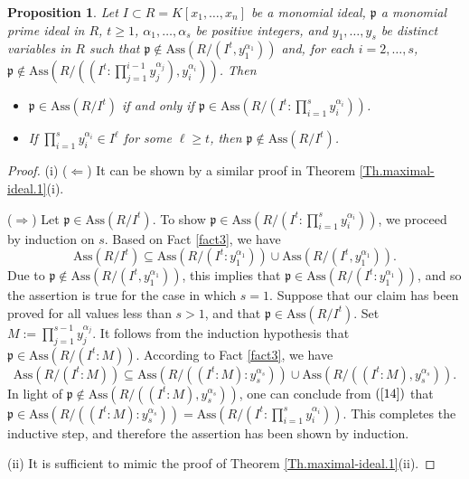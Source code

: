 \documentclass[11pt]{amsart}
\newtheorem{proposition}[theorem]{Proposition}
\begin{document}
\begin{proposition}    \label{Pro.maximal-ideal.1}
Let $I\subset R=K[x_1, \ldots, x_n]$ be a monomial ideal,  $\mathfrak{p}$ a monomial prime  ideal in $R$,  $t\geq 1$,  $\alpha_1, \ldots, \alpha_s$ be positive integers, and  $y_1, \ldots, y_s$ be distinct variables in $R$  such that  $\mathfrak{p}\notin \mathrm{Ass}(R/(I^t,  y_{1}^{\alpha_1}))$ and, for each  $i=2, \ldots, s$,
  $\mathfrak{p}\notin \mathrm{Ass}(R/((I^t:\prod_{j=1}^{i-1} y_j^{\alpha_j}), y_{i}^{\alpha_{i}}))$.  Then 
\begin{itemize}
\item[(i)] $\mathfrak{p}\in \mathrm{Ass}(R/I^t)$ if and only if $\mathfrak{p}\in \mathrm{Ass}(R/(I^t: \prod_{i=1}^sy_i^{\alpha_i}))$. 
\item[(ii)] If $\prod_{i=1}^{s}y_i^{\alpha_i} \in I^\ell$ for some $\ell \geq t$, then  $\mathfrak{p}\notin \mathrm{Ass}(R/I^t)$.
\end{itemize}
\end{proposition} 

\begin{proof}
(i) ($\Leftarrow$) It can be shown by a similar proof in Theorem  \ref{Th.maximal-ideal.1}(i). 

($\Rightarrow$) Let $\mathfrak{p}\in \mathrm{Ass}(R/I^t)$. To show   $\mathfrak{p}\in \mathrm{Ass}(R/(I^t: \prod_{i=1}^sy_i^{\alpha_i}))$,  we proceed by induction on  $s$. Based on   Fact \ref{fact3}, we have 
$$\mathrm{Ass}(R/I^t) \subseteq \mathrm{Ass}(R/(I^t:y_1^{\alpha_1})) \cup \mathrm{Ass}(R/(I^t, y_1^{\alpha_1})).$$
Due to  $\mathfrak{p}\notin \mathrm{Ass}(R/(I^t, y_1^{\alpha_1}))$, this implies  that  $\mathfrak{p}\in \mathrm{Ass}(R/(I^t:y_1^{\alpha_1}))$, and so the assertion  is true for the case in which $s=1$. Suppose that our claim has been proved for all values  less than $s>1$, and that $\mathfrak{p}\in \mathrm{Ass}(R/I^t)$. Set   $M:=\prod_{j=1}^{s-1}y_j^{\alpha_j}$. It follows from the induction hypothesis that   $\mathfrak{p}\in \mathrm{Ass}(R/(I^t:M))$. 
According to  Fact \ref{fact3}, we have 
\begin{equation} \label{14}
\mathrm{Ass}(R/(I^t:M))\subseteq \mathrm{Ass}(R/((I^t:M):y_s^{\alpha_s}) )\cup \mathrm{Ass}(R/((I^t:M),y_s^{\alpha_s})).
\end{equation} 
In  light of  $\mathfrak{p}\notin\mathrm{Ass}(R/((I^t:M), y_s^{\alpha_s}))$, one can conclude from 
 $(\ref{14})$ that  $\mathfrak{p}\in \mathrm{Ass}(R/((I^t:M): y_s^{\alpha_s}))=\mathrm{Ass}(R/(I^t:\prod_{i=1}^sy_i^{\alpha_i}))$. 
This completes the inductive step, and therefore the assertion  has been shown  by induction. 

(ii) It is sufficient    to mimic the proof of Theorem  \ref{Th.maximal-ideal.1}(ii).
\end{proof}
\end{document}
